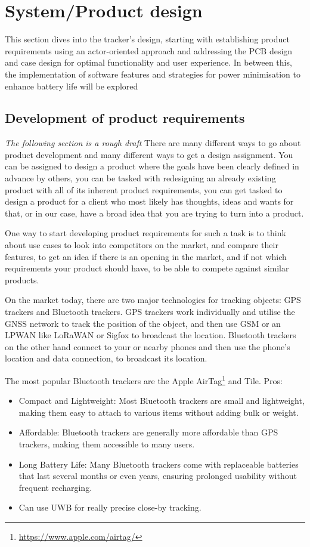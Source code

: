 \section{System/Product design} \label{sec:design}
This section dives into the tracker's design, starting with establishing product requirements using an actor-oriented approach and addressing the \ac{PCB} design and case design for optimal functionality and user experience.
In between this, the implementation of software features and strategies for power minimisation to enhance battery life will be explored

\subsection{Development of product requirements}
\textit{The following section is a rough draft}
There are many different ways to go about product development and many different ways to get a design assignment. You can be assigned to design a product where the goals have been clearly defined in advance by others, you can be tasked with redesigning an already existing product with all of its inherent product requirements, you can get tasked to design a product for a client who most likely has thoughts, ideas and wants for that, or in our case, have a broad idea that you are trying to turn into a product.

One way to start developing product requirements for such a task is to think about use cases to look into competitors on the market, and compare their features, to get an idea if there is an opening in the market, and if not which requirements your product should have, to be able to compete against similar products.

On the market today, there are two major technologies for tracking objects: \ac{GPS} trackers and Bluetooth trackers.
\ac{GPS} trackers work individually and utilise the \ac{GNSS} network to track the position of the object, and then use \ac{GSM} or an \ac{LPWAN} like \ac{LoRaWAN} or Sigfox to broadcast the location.
Bluetooth trackers on the other hand connect to your or nearby phones and then use the phone's location and data connection, to broadcast its location.



The most popular Bluetooth trackers are the Apple AirTag\footnote{\url{https://www.apple.com/airtag/}} and Tile.
Pros:
\begin{itemize}
  \item Compact and Lightweight: Most Bluetooth trackers are small and lightweight, making them easy to attach to various items without adding bulk or weight.
  \item Affordable: Bluetooth trackers are generally more affordable than \ac{GPS} trackers, making them accessible to many users.
  \item Long Battery Life: Many Bluetooth trackers come with replaceable batteries that last several months or even years, ensuring prolonged usability without frequent recharging.
  \item Can use \ac{UWB} for really precise close-by tracking.
\end{itemize}

